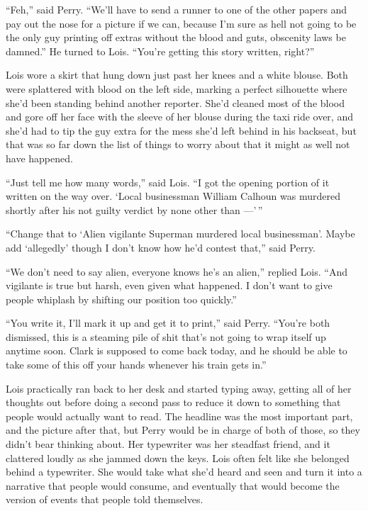 \documentclass[ebook,12pt]{memoir}
\begin{document}
``Feh,'' said Perry. ``We'll have to send a runner to one of the other
papers and pay out the nose for a picture if we can, because I'm sure as
hell not going to be the only guy printing off extras without the blood
and guts, obscenity laws be damned.'' He turned to Lois. ``You're
getting this story written, right?''

Lois wore a skirt that hung down just past her knees and a white blouse.
Both were splattered with blood on the left side, marking a perfect
silhouette where she'd been standing behind another reporter. She'd
cleaned most of the blood and gore off her face with the sleeve of her
blouse during the taxi ride over, and she'd had to tip the guy extra for
the mess she'd left behind in his backseat, but that was so far down the
list of things to worry about that it might as well not have happened.

``Just tell me how many words,'' said Lois. ``I got the opening portion
of it written on the way over. `Local businessman William Calhoun was
murdered shortly after his not guilty verdict by none other than
---'\,''

``Change that to `Alien vigilante Superman murdered local businessman'.
Maybe add `allegedly' though I don't know how he'd contest that,'' said
Perry.

``We don't need to say alien, everyone knows he's an alien,'' replied
Lois. ``And vigilante is true but harsh, even given what happened. I
don't want to give people whiplash by shifting our position too
quickly.''

``You write it, I'll mark it up and get it to print,'' said Perry.
``You're both dismissed, this is a steaming pile of shit that's not
going to wrap itself up anytime soon. Clark is supposed to come back
today, and he should be able to take some of this off your hands
whenever his train gets in.''

Lois practically ran back to her desk and started typing away, getting
all of her thoughts out before doing a second pass to reduce it down to
something that people would actually want to read. The headline was the
most important part, and the picture after that, but Perry would be in
charge of both of those, so they didn't bear thinking about. Her
typewriter was her steadfast friend, and it clattered loudly as she
jammed down the keys. Lois often felt like she belonged behind a
typewriter. She would take what she'd heard and seen and turn it into a
narrative that people would consume, and eventually that would become
the version of events that people told themselves.
\end{document}
